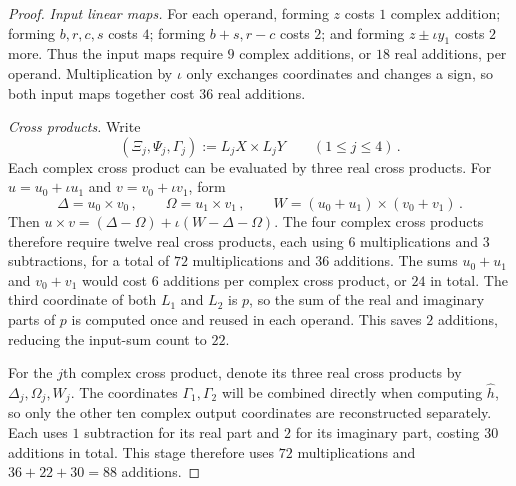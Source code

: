 \documentclass[11pt,reqno]{amsart}
\numberwithin{equation}{section}
\begin{document}
\begin{proof}
\emph{Input linear maps.} For each operand, forming $z$ costs $1$ complex
addition; forming $b,r,c,s$ costs $4$; forming $b+s,r-c$ costs $2$; and
forming $z\pm\iota y_1$ costs $2$ more. Thus the input maps require $9$
complex additions, or $18$ real additions, per operand. Multiplication
by $\iota$ only exchanges coordinates and changes a sign, so both input
maps together cost $36$ real additions.

\emph{Cross products.} Write
\[
(\Xi_j,\Psi_j,\Gamma_j):=L_jX\times L_jY\qquad(1\le j\le4)\,.
\]
Each complex cross product can be evaluated by three real cross products.
For $u=u_0+\iota u_1$ and $v=v_0+\iota v_1$, form
\[
\Delta=u_0\times v_0\,,\qquad \Omega=u_1\times v_1\,,\qquad
W=(u_0+u_1)\times(v_0+v_1)\,.
\]
Then $u\times v=(\Delta-\Omega)+\iota(W-\Delta-\Omega)$. The four
complex cross products therefore require twelve real cross products,
each using $6$ multiplications and $3$ subtractions, for a total of $72$
multiplications and $36$ additions. The sums $u_0+u_1$ and $v_0+v_1$
would cost $6$ additions per complex cross product, or $24$ in total.
The third coordinate of both $L_1$ and $L_2$ is $p$, so the sum of the
real and imaginary parts of $p$ is computed once and reused in each
operand. This saves $2$ additions, reducing the input-sum count to $22$.

For the $j$th complex cross product, denote its three real cross products
by $\Delta_j,\Omega_j,W_j$. The coordinates $\Gamma_1,\Gamma_2$ will be
combined directly when computing $\widehat h$, so only the other ten
complex output coordinates are reconstructed separately. Each uses $1$
subtraction for its real part and $2$ for its imaginary part, costing
$30$ additions in total. This stage therefore uses $72$ multiplications
and $36+22+30=88$ additions.


\end{proof}
\end{document}
